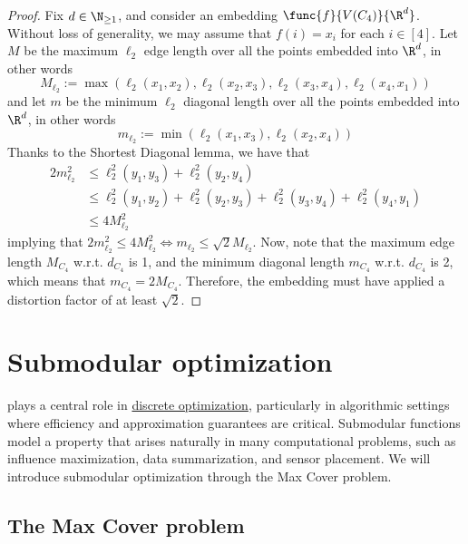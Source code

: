 \documentclass[a4paper, 12pt]{report}
\begin{document}
    \begin{proof}
        Fix $d \in \N_{\ge 1}$, and consider an embedding $\func{f}{V(C_4)}{\R^d}$. Without loss of generality, we may assume that $f(i) = x_i$ for each $i \in [4]$. Let $M$ be the maximum $\ell_2$ edge length over all the points embedded into $\R^d$, in other words $$M_{\ell_2} := \max(\ell_2(x_1, x_2), \ell_2(x_2, x_3), \ell_2(x_3, x_4), \ell_2(x_4, x_1))$$ and let $m$ be the minimum $\ell_2$ diagonal length over all the points embedded into $\R^d$, in other words $$m_{\ell_2} := \min(\ell_2(x_1, x_3), \ell_2(x_2, x_4))$$ Thanks to the Shortest Diagonal lemma, we have that
        \begin{equation*}
            \begin{split}
                2m_{\ell_2}^2 &\le \ell_2^2(y_1, y_3) + \ell_2^2(y_2, y_4) \\
                     &\le \ell_2^2(y_1, y_2) + \ell_2^2(y_2, y_3) + \ell_2^2(y_3, y_4) + \ell_2^2(y_4, y_1) \\
                     &\le 4M_{\ell_2}^2
            \end{split}
        \end{equation*}
        implying that $2m_{\ell_2}^2 \le 4M_{\ell_2}^2 \iff m_{\ell_2} \le \sqrt 2 M_{\ell_2}$. Now, note that the maximum edge length $M_{C_4}$ w.r.t. $d_{C_4}$ is 1, and the minimum diagonal length $m_{C_4}$ w.r.t. $d_{C_4}$ is 2, which means that $m_{C_4} = 2 M_{C_4}$. Therefore, the embedding must have applied a distortion factor of at least $\sqrt 2$.
    \end{proof}

    \chapter{Submodular optimization}

     plays a central role in \href{https://en.wikipedia.org/wiki/Discrete_optimization}{discrete optimization}, particularly in algorithmic settings where efficiency and approximation guarantees are critical. Submodular functions model a  property that arises naturally in many computational problems, such as influence maximization, data summarization, and sensor placement. We will introduce submodular optimization through the Max Cover problem.

    \section{The Max Cover problem}
\end{document}
